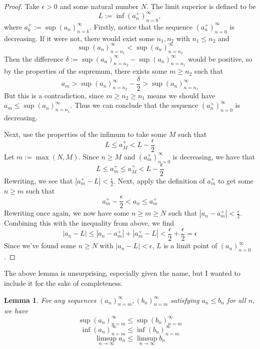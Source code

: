\documentclass[11pt, oneside]{article}
\newtheorem{lemma}{Lemma}
\theoremstyle{definition}
\begin{document}
\begin{proof}
    Take $\epsilon > 0$ and some natural number $N$. The limit superior is defined to be
    $$L := \inf (a_n^+)_{n=0}^\infty,$$
    where $a_k^+ := \sup (a_n)_{n=k}^\infty$. Firstly, notice that the sequence $(a_n^+)_{n=0}^\infty$ is decreasing.
    If it were not, there would exist some $n_1, n_2$ with $n_1 \leq n_2$ and
    $$\sup (a_n)_{n=n_1}^\infty < \sup (a_n)_{n=n_2}^\infty$$
    Then the difference $\delta := \sup (a_n)_{n=n_2}^\infty - \sup (a_n)_{n=n_1}^\infty$ would be positive, so by the properties of the supremum, there exists some $m \geq n_2$ such that
    $$a_m > \sup (a_n)_{n=n_2}^\infty - \frac{\delta}{2} > \sup (a_n)_{n=n_1}^\infty$$
    But this is a contradiction, since $m \geq n_2 \geq n_1$ means we should have $a_m \leq \sup (a_n)_{n=n_1}^\infty$.
    Thus we can conclude that the sequence $(a_n^+)_{n=0}^\infty$ is decreasing.
    
    Next, use the properties of the infimum to take some $M$ such that
    $$L \leq a_M^+ < L - \frac{\epsilon}{2}$$
    Let $m := \max(N, M)$. Since $n \geq M$ and $(a_m^+)_{n=0}^\infty$ is decreasing, we have that
    $$L \leq a_m^+ \leq a_M^+ < L - \frac{\epsilon}{2}$$
    Rewriting, we see that $|a_m^+ - L| < \frac{\epsilon}{2}$.
    Next, apply the definition of $a_m^+$ to get some $n \geq m$ such that
    $$a_m^+ - \frac{\epsilon}{2} < a_n \leq a_m^+$$
    Rewriting once again, we now have some $n \geq m \geq N$ such that $|a_n - a_m^+| < \frac{\epsilon}{2}$. Combining this with the inequality from above, we find
    $$|a_n - L| \leq |a_n - a_m^+| + |a_m^+ - L| < \frac{\epsilon}{2} + \frac{\epsilon}{2} = \epsilon$$
    Since we've found some $n \geq N$ with $|a_n - L| < \epsilon$, $L$ is a limit point of $(a_n)_{n=0}^\infty$.
\end{proof}

The above lemma is unsurprising, especially given the name, but I wanted to include it for the sake of completeness.
\begin{lemma}\label{comparison}
    For any sequences $(a_n)_{n=m}^\infty, (b_n)_{n=m}^\infty$ satisfying $a_n \leq b_n$ for all $n$, we have
    \begin{equation}
        \sup (a_n)_{n=m}^\infty \leq \sup (b_n)_{n=m}^\infty
    \end{equation}
    \begin{equation}
        \inf (a_n)_{n=m}^\infty \leq \inf (b_n)_{n=m}^\infty
    \end{equation}
    \begin{equation}
        \limsup_{n \rightarrow \infty} a_n \leq \limsup_{n \rightarrow \infty} b_n
    \end{equation}
\end{lemma}
\end{document}
